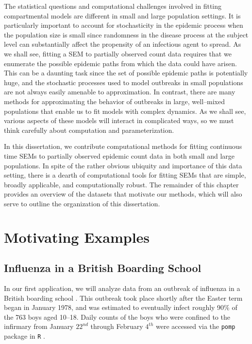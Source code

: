 The statistical questions and computational challenges involved in fitting compartmental models are different in small and large population settings. It is particularly important to account for stochasticity in the epidemic process when the population size is small since randomness in the disease process at the subject level can substantially affect the propensity of an infectious agent to spread. As we shall see, fitting a SEM to partially observed count data requires that we enumerate the possible epidemic paths from which the data could have arisen. This can be a daunting task since the set of possible epidemic paths is potentially huge, and the stochastic processes used to model outbreaks in small populations are not always easily amenable to approximation. In contrast, there are many methods for approximating the behavior of outbreaks in large, well--mixed populations that enable us to fit models with complex dynamics. As we shall see, various aspects of these models will interact in complicated ways, so we must think carefully about computation and parameterization. 

In this dissertation, we contribute computational methods for fitting continuous time SEMs to partially observed epidemic count data in both small and large populations. In spite of the rather obvious ubiquity and importance of this data setting, there is a dearth of computational tools for fitting SEMs that are simple, broadly applicable, and computationally robust. The remainder of this chapter provides an overview of the datasets that motivate our methods, which will also serve to outline the organization of this dissertation. 

\section{Motivating Examples}
\label{sec:motivating_examples}

\subsection{Influenza in a British Boarding School}
\label{subsec:bbs_descrip}

In our first application, we will analyze data from an outbreak of influenza in a British boarding school \cite{anon1978, davies1982}. This outbreak took place shortly after the Easter term began in January 1978, and was estimated to eventually infect roughly 90\% of the 763 boys aged 10--18. Daily counts of the boys who were confined to the infirmary from January $22^{nd}$ through February $4^{th}$ were accessed via the \texttt{pomp} package in \texttt{R} \citep{pomp}.


